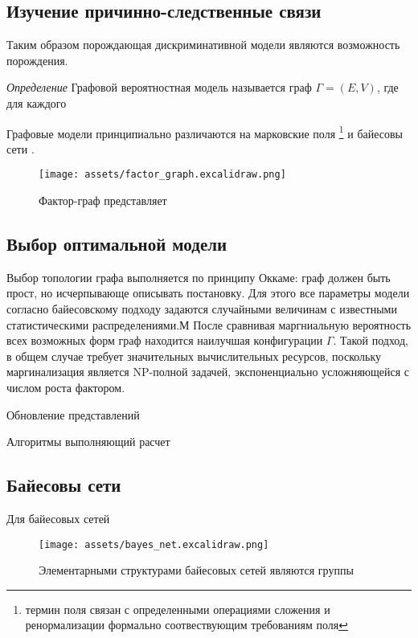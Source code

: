 \subsection{Изучение причинно-следственные связи}



Таким образом порождающая дискриминативной модели являются возможность порождения.


\textit{Определение} Графовой вероятностная модель называется граф $\Gamma = (E,V)$, где для каждого 

Графовые модели принципиально различаются на марковские поля
\footnote{термин поля связан с определенными операциями сложения и ренормализации формально соотвествующим требованиям поля}
и байесовы сети \cite{lafferty2001conditional}.


\begin{figure}[h]
    \centering
    \texttt{[image: assets/factor\_graph.excalidraw.png]}
    \caption{Фактор-граф представляет}
    \label{graph}
\end{figure}


\subsection{Выбор оптимальной модели}


Выбор топологии графа выполняется по принципу Оккаме: граф должен быть прост, но исчерпывающе описывать постановку. Для этого
все параметры модели согласно байесовскому подходу задаются случайными величинам с известными статистическими распределениями.М
После сравнивая маргниальную вероятность всех возможных форм граф находится наилучшая конфигурации $\Gamma$. Такой подход, в общем
случае требует значительных вычислительных ресурсов, поскольку маргинализация является NP-полной задачей, экспоненциально усложняющейся
с числом роста фактором.

Обновление представлений 

Алгоритмы выполняющий расчет


\subsection{Байесовы сети}

Для байесовых сетей 

\begin{figure}[h]
    \centering
    \texttt{[image: assets/bayes\_net.excalidraw.png]}
    \caption{Элементарными структурами байесовых сетей являются группы }
    \label{bayes-net}
\end{figure}


